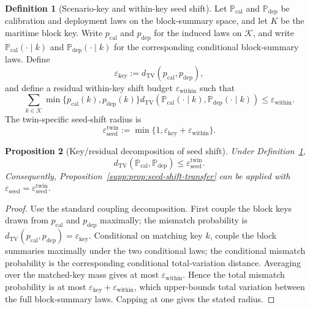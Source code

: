 \documentclass[11pt]{article}
\newcommand{\Prob}{\mathbb{P}}
\newcommand{\1}{\mathbf{1}}
\theoremstyle{definition}
\newtheorem{definition}{Definition}[section]
\theoremstyle{plain}
\newtheorem{proposition}[definition]{Proposition}
\theoremstyle{remark}
\begin{document}
\begin{definition}[Scenario-key and within-key seed shift]
\label{supp:def:key-within-shift}
Let $\Prob_{\mathrm{cal}}$ and $\Prob_{\mathrm{dep}}$ be calibration and deployment laws on the block-summary space, and let $K$ be the maritime block key. Write $p_{\mathrm{cal}}$ and $p_{\mathrm{dep}}$ for the induced laws on $\mathcal K$, and write $\Prob_{\mathrm{cal}}(\cdot\mid k)$ and $\Prob_{\mathrm{dep}}(\cdot\mid k)$ for the corresponding conditional block-summary laws. Define
\[
\varepsilon_{\mathrm{key}}
:=
 d_{\mathrm{TV}}(p_{\mathrm{cal}},p_{\mathrm{dep}}),
\]
and define a residual within-key shift budget $\varepsilon_{\mathrm{within}}$ such that
\[
\sum_{k\in\mathcal K}
\min\{p_{\mathrm{cal}}(k),p_{\mathrm{dep}}(k)\}
 d_{\mathrm{TV}}\!\left(
 \Prob_{\mathrm{cal}}(\cdot\mid k),
 \Prob_{\mathrm{dep}}(\cdot\mid k)
 \right)
\le
\varepsilon_{\mathrm{within}}.
\]
The twin-specific seed-shift radius is
\[
\varepsilon_{\mathrm{seed}}^{\mathrm{twin}}
:=
\min\{1,\varepsilon_{\mathrm{key}}+\varepsilon_{\mathrm{within}}\}.
\]
\end{definition}

\begin{proposition}[Key/residual decomposition of seed shift]
\label{supp:prop:key-residual-shift}
Under Definition~\ref{supp:def:key-within-shift},
\[
 d_{\mathrm{TV}}(\Prob_{\mathrm{cal}},\Prob_{\mathrm{dep}})
 \le
 \varepsilon_{\mathrm{seed}}^{\mathrm{twin}}.
\]
Consequently, Proposition~\ref{supp:prop:seed-shift-transfer} can be applied with $\varepsilon_{\mathrm{seed}}=\varepsilon_{\mathrm{seed}}^{\mathrm{twin}}$.
\end{proposition}

\begin{proof}
Use the standard coupling decomposition. First couple the block keys drawn from $p_{\mathrm{cal}}$ and $p_{\mathrm{dep}}$ maximally; the mismatch probability is $d_{\mathrm{TV}}(p_{\mathrm{cal}},p_{\mathrm{dep}})=\varepsilon_{\mathrm{key}}$. Conditional on matching key $k$, couple the block summaries maximally under the two conditional laws; the conditional mismatch probability is the corresponding conditional total-variation distance. Averaging over the matched-key mass gives at most $\varepsilon_{\mathrm{within}}$. Hence the total mismatch probability is at most $\varepsilon_{\mathrm{key}}+\varepsilon_{\mathrm{within}}$, which upper-bounds total variation between the full block-summary laws. Capping at one gives the stated radius.
\end{proof}
\end{document}
